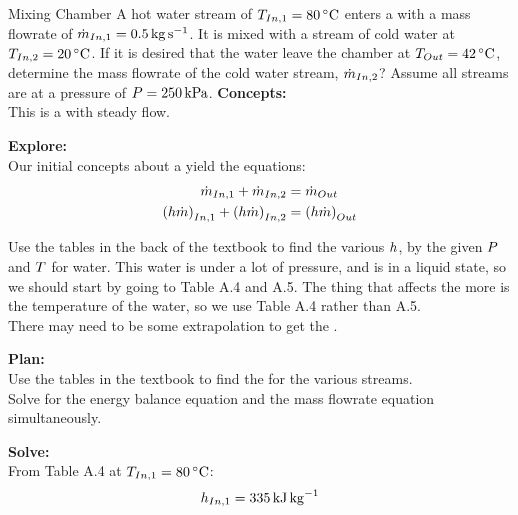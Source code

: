 \begin{example}{Mixing Chamber}
  A hot water stream of $\Temp_{In, 1} = \SI{80}{\degreeCelsius}$ enters a  with a mass flowrate of $\dot{m}_{In, 1} = \SI{0.5}{\kilo\gram\per\second}$.
  It is mixed with a stream of cold water at $\Temp_{In, 2} = \SI{20}{\degreeCelsius}$.
  If it is desired that the water leave the chamber at $\Temp_{Out} = \SI{42}{\degreeCelsius}$, determine the mass flowrate of the cold water stream, $\dot{m}_{In, 2}$?
  Assume all streams are at a pressure of $P = \SI{250}{\kilo\pascal}$.
  \tcblower{}
  \textbf{Concepts:} \\
  This is a  with steady flow.

  \textbf{Explore:} \\
  Our initial concepts about a  yield the equations:
  \begin{align*}
    \dot{m}_{In, 1} + \dot{m}_{In, 2} &= \dot{m}_{Out} \\
    {(h \dot{m})}_{In, 1} + {(h \dot{m})}_{In, 2} &= {(h \dot{m})}_{Out}
  \end{align*}

  Use the tables in the back of the textbook to find the various $h$, by the given $P$ and $T$ for water.
  This water is under a lot of pressure, and is in a liquid state, so we should start by going to Table A.4 and A.5.\@
  The thing that affects the  more is the temperature of the water, so we use Table A.4 rather than A.5.\@ \\
  There may need to be some extrapolation to get the .

  \textbf{Plan:} \\
  Use the tables in the textbook to find the  for the various streams. \\
  Solve for the energy balance equation and the mass flowrate equation simultaneously.

  \textbf{Solve:} \\
  From Table A.4 at $\Temp_{In, 1} = \SI{80}{\degreeCelsius}$:
  \begin{equation*}
    h_{In, 1} = \SI{335}{\kilo\joule\per\kilo\gram}
  \end{equation*}


\end{example}
